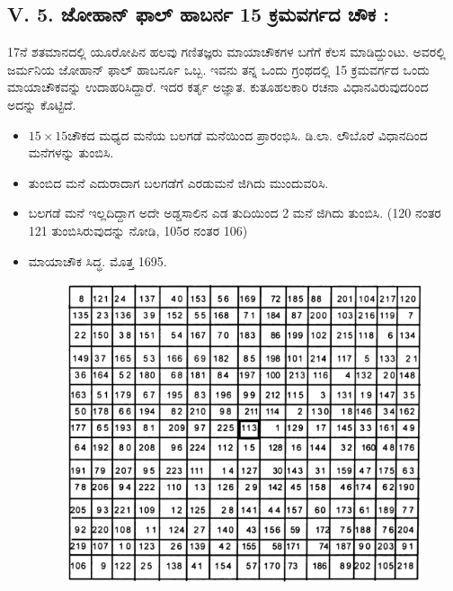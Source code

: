 \subsection*{V. 5. ಜೋಹಾನ್ ಫಾಲ್ ಹಾಬರ್ನ 15 ಕ್ರಮವರ್ಗದ ಚೌಕ :}

17ನೆ ಶತಮಾನದಲ್ಲಿ ಯೂರೋಪಿನ ಹಲವು ಗಣಿತಜ್ಞರು ಮಾಯಾಚೌಕಗಳ ಬಗೆಗೆ ಕೆಲಸ ಮಾಡಿದ್ದುಂಟು. ಅವರಲ್ಲಿ ಜರ್ಮನಿಯ ಜೋಹಾನ್ ಫಾಲ್ ಹಾಬರ್ನೂ ಒಬ್ಬ. ಇವನು ತನ್ನ ಒಂದು ಗ್ರಂಥದಲ್ಲಿ 15 ಕ್ರಮವರ್ಗದ ಒಂದು ಮಾಯಾಚೌಕವನ್ನು ಉದಾಹರಿಸಿದ್ದಾರೆ. ಇದರ ಕರ್ತೃ ಅಜ್ಞಾತ. ಕುತೂಹಲಕಾರಿ ರಚನಾ ವಿಧಾನವಿರುವುದರಿಂದ ಅದನ್ನು ಕೊಟ್ಟಿದೆ.
\begin{itemize}
	\item $15 \times 15$ಚೌಕದ ಮಧ್ಯದ ಮನೆಯ ಬಲಗಡೆ ಮನೆಯಿಂದ ಪ್ರಾರಂಭಿಸಿ. ಡಿ.ಲಾ. ಲೌಬೊರೆ ವಿಧಾನದಿಂದ ಮನೆಗಳನ್ನು ತುಂಬಿಸಿ.
	\item ತುಂಬಿದ ಮನೆ ಎದುರಾದಾಗ ಬಲಗಡೆಗೆ ಎರಡುಮನೆ ಜಿಗಿದು ಮುಂದುವರಿಸಿ.
	\item ಬಲಗಡೆ ಮನೆ ಇಲ್ಲದಿದ್ದಾಗ ಅದೇ ಅಡ್ಡಸಾಲಿನ ಎಡ ತುದಿಯಿಂದ 2 ಮನೆ ಜಿಗಿದು ತುಂಬಿಸಿ. (120 ನಂತರ 121 ತುಂಬಿಸಿರುವುದನ್ನು ನೋಡಿ, 105ರ ನಂತರ 106)
	\item ಮಾಯಾಚೌಕ ಸಿದ್ಧ. ಮೊತ್ತ 1695.
	\begin{figure}[h]
	\includegraphics{src/figures/chap4/fig4.23.jpg}
	\end{figure}
\end{itemize}

